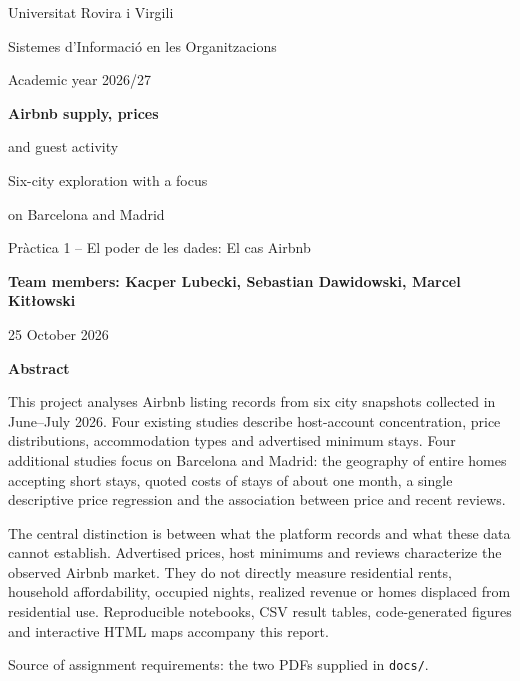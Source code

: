 \documentclass[11pt,a4paper]{article}
\begin{document}
\hypersetup{pageanchor=false}
\begin{titlepage}
\centering
\vspace*{1.6cm}
{\Large Universitat Rovira i Virgili\par}
{\large Sistemes d'Informaci\'o en les Organitzacions\par}
{\large Academic year 2026/27\par}
\vspace{1.7cm}
{\huge\bfseries Airbnb supply, prices\par and guest activity\par}
\vspace{0.5cm}
{\Large Six-city exploration with a focus\par on Barcelona and Madrid\par}
\vspace{1.2cm}
{\large Pr\`actica 1 -- El poder de les dades: El cas Airbnb\par}
\vspace{1cm}
\textbf{Team members: Kacper Lubecki, Sebastian Dawidowski, Marcel Kit\l{}owski}\par
25 October 2026\par
\vspace{1.2cm}
\begin{minipage}{0.88\textwidth}
\textbf{Abstract}\par
This project analyses \TotalListings{} Airbnb listing records from six city snapshots collected in June--July 2026. Four existing studies describe host-account concentration, price distributions, accommodation types and advertised minimum stays. Four additional studies focus on Barcelona and Madrid: the geography of entire homes accepting short stays, quoted costs of stays of about one month, a single descriptive price regression and the association between price and recent reviews.

The central distinction is between what the platform records and what these data cannot establish. Advertised prices, host minimums and reviews characterize the observed Airbnb market. They do not directly measure residential rents, household affordability, occupied nights, realized revenue or homes displaced from residential use. Reproducible notebooks, CSV result tables, code-generated figures and interactive HTML maps accompany this report.
\end{minipage}
\vfill
{\small Source of assignment requirements: the two PDFs supplied in \texttt{docs/}.\par}
\end{titlepage}
\hypersetup{pageanchor=true}
\end{document}
